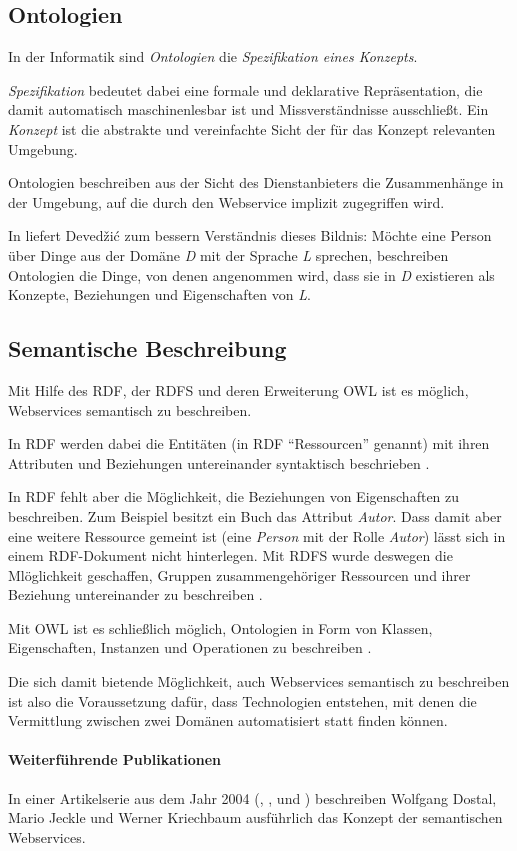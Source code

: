 \subsection{Ontologien}

In der Informatik sind \emph{Ontologien} die \emph{Spezifikation eines Konzepts}. 

\emph{Spezifikation} bedeutet dabei eine formale und deklarative Repräsentation, die damit automatisch maschinenlesbar ist und Missverständnisse ausschließt. Ein \emph{Konzept} ist die abstrakte und vereinfachte Sicht der für das Konzept relevanten Umgebung.

Ontologien beschreiben aus der Sicht des Dienstanbieters die Zusammenhänge in der Umgebung, auf die durch den Webservice implizit zugegriffen wird.

In \cite{dcswe} liefert Devedžić zum bessern Verständnis dieses Bildnis: Möchte eine Person über Dinge aus der Domäne \emph{D} mit der Sprache \emph{L} sprechen, beschreiben Ontologien die Dinge, von denen angenommen wird, dass sie in \emph{D} existieren als Konzepte, Beziehungen und Eigenschaften von \emph{L}.

\subsection{Semantische Beschreibung}

Mit Hilfe des \ac{RDF}, der \ac{RDFS} und deren Erweiterung \ac{OWL} ist es möglich, Webservices semantisch zu beschreiben. 

In \ac{RDF} werden dabei die Entitäten (in \ac{RDF} "`Ressourcen"' genannt) mit ihren Attributen und Beziehungen untereinander syntaktisch beschrieben \cite{w3c-rdf}.

In \ac{RDF} fehlt aber die Möglichkeit, die Beziehungen von Eigenschaften zu beschreiben. Zum Beispiel besitzt ein Buch das Attribut \emph{Autor}. Dass damit aber eine weitere Ressource gemeint ist (eine \emph{Person} mit der Rolle \emph{Autor}) lässt sich in einem \ac{RDF}-Dokument nicht hinterlegen. Mit \ac{RDFS} wurde deswegen die Mlöglichkeit geschaffen, Gruppen zusammengehöriger Ressourcen und ihrer Beziehung untereinander zu beschreiben \cite{w3c-rdfs}.

Mit \ac{OWL} ist es schließlich möglich, Ontologien in Form von Klassen, Eigenschaften, Instanzen und Operationen zu beschreiben \cite{w3c-owl2primer}.

Die sich damit bietende Möglichkeit, auch Webservices semantisch zu beschreiben ist also die Voraussetzung dafür, dass Technologien entstehen, mit denen die Vermittlung zwischen zwei Domänen automatisiert statt finden können.

\paragraph{Weiterführende Publikationen} In einer Artikelserie aus dem Jahr 2004 (\cite{xmlspek1}, \cite{xmlspek2}, \cite{xmlspek3} und \cite{xmlspek4}) beschreiben Wolfgang Dostal, Mario Jeckle und Werner Kriechbaum ausführlich das Konzept der semantischen Webservices.